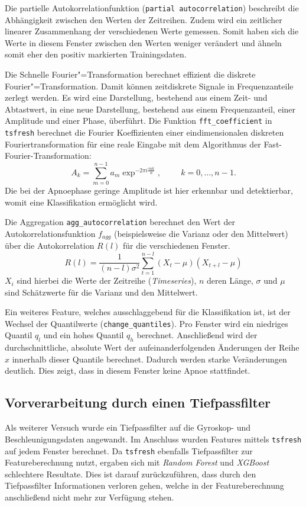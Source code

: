 Die partielle Autokorrelationfunktion (\texttt{partial autocorrelation}) beschreibt die Abhängigkeit zwischen den Werten der Zeitreihen. 
Zudem wird ein zeitlicher linearer Zusammenhang der verschiedenen Werte gemessen.
Somit haben sich die Werte in diesem Fenster zwischen den Werten weniger verändert und ähneln somit eher den positiv markierten Trainingsdaten.

Die Schnelle Fourier"=Transformation berechnet effizient die diskrete Fourier"=Transformation.
Damit können zeitdiskrete Signale in Frequenzanteile zerlegt werden. 
Es wird eine Darstellung, bestehend aus einem Zeit- und Abtastwert, in eine neue Darstellung, bestehend aus einem Frequenzanteil, einer Amplitude und einer Phase, überführt.
Die Funktion \texttt{fft\_coefficient} in \texttt{tsfresh} berechnet die Fourier Koeffizienten einer eindimensionalen diskreten Fouriertransformation für eine reale Eingabe mit dem Algorithmus der Fast-Fourier-Transformation:
\[A_k = \sum_{m=0}^{n-1} a_m \exp ^ {-2\pi i \frac{mk}{n}}, \hspace{1cm} k = 0,\dots,n-1.\]
Die bei der Apnoephase geringe Amplitude ist hier erkennbar und detektierbar, womit eine Klassifikation ermöglicht wird.

Die Aggregation \texttt{agg\_autocorrelation} berechnet den Wert der Autokorrelationsfunktion $f_{agg}$ (beispielsweise die Varianz oder den Mittelwert) über die Autokorrelation $R(l)$ für die verschiedenen Fenster. 
\[R(l) = \frac{1}{(n-l)\sigma ^2} \sum_{t=1}^{n-l} (X_t - \mu) (X_{t+l} - \mu)\]
$X_i$ sind hierbei  die Werte der Zeitreihe (\textit{Timeseries}), $n$ deren Länge, $\sigma$ und $\mu$ sind Schätzwerte für die Varianz und den Mittelwert.

Ein weiteres Feature, welches ausschlaggebend für die Klassifikation ist, ist der Wechsel der Quantilwerte (\texttt{change\_quantiles}).
Pro Fenster wird ein niedriges Quantil $q_l$ und ein hohes Quantil $q_h$ berechnet. 
Anschließend wird der durchschnittliche, absolute Wert der aufeinanderfolgenden Änderungen der Reihe $x$ innerhalb dieser Quantile berechnet.
Dadurch werden starke Veränderungen deutlich.
Dies zeigt, dass in diesem Fenster keine Apnoe stattfindet. 

\subsection{Vorverarbeitung durch einen Tiefpassfilter}
Als weiterer Versuch wurde ein Tiefpassfilter auf die Gyroskop- und Beschleunigungsdaten angewandt. 
Im Anschluss wurden Features mittels \texttt{tsfresh} auf jedem Fenster berechnet.
Da \texttt{tsfresh} ebenfalls Tiefpassfilter zur Featureberechnung nutzt, ergaben sich mit \textit{Random Forest} und \textit{XGBoost} schlechtere Resultate.
Dies ist darauf zurückzuführen, dass durch den Tiefpassfilter Informationen verloren gehen, welche in der Featureberechnung anschließend nicht mehr zur Verfügung stehen. 
